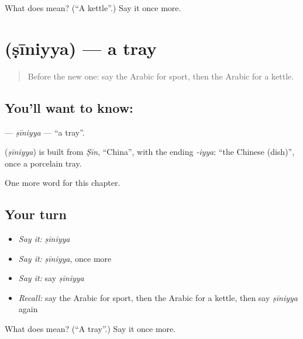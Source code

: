 \begin{tcolorbox}[breakable,colback=teal!4,colframe=teal!35!black,title={Before you move on}]
What does  mean? (\textquotedblleft{}A kettle\textquotedblright{}.) Say it once more.
\end{tcolorbox}
\section[\texorpdfstring{\ar{صينية} (ṣīniyya)}{صينية (ṣīniyya)}]{ (ṣīniyya) — a tray}

\label{lesson:AR-C278-siniyya}



\begin{quote}
Before the new one: say the Arabic for sport, then the Arabic for a kettle.
\end{quote}

\subsection*{You'll want to know: }
\textbf{} — \emph{ṣīniyya} — \textquotedblleft{}a tray\textquotedblright{}.

\begin{cousinweb}
\textbf{} (\emph{ṣīniyya}) is built from \emph{Ṣīn}, \textquotedblleft{}China\textquotedblright{}, with the ending \emph{-iyya}: \textquotedblleft{}the Chinese (dish)\textquotedblright{}, once a porcelain tray.
\end{cousinweb}

\begin{grammarlens}[title={What you've built}]
One more word for this chapter.
\end{grammarlens}

\subsection*{Your turn}
\begin{itemize}
\raggedright
  \item \emph{Say it:} \emph{ṣīniyya}
  \item \emph{Say it:} \emph{ṣīniyya}, once more
  \item \emph{Say it:} say \emph{ṣīniyya}
  \item \emph{Recall:} say the Arabic for sport, then the Arabic for a kettle, then say \emph{ṣīniyya} again
\end{itemize}

\begin{tcolorbox}[breakable,colback=teal!4,colframe=teal!35!black,title={Before you move on}]
What does  mean? (\textquotedblleft{}A tray\textquotedblright{}.) Say it once more.
\end{tcolorbox}
